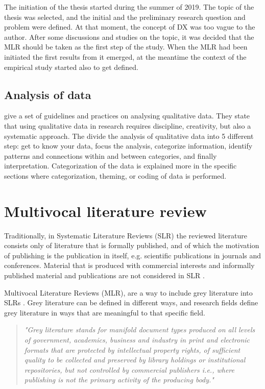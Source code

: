 \documentclass[english, 12pt, a4paper, sci, utf8, a-1b, online]{aaltothesis}
\begin{document}
The initiation of the thesis started during the summer of 2019. The topic of the thesis was selected, and the initial and the preliminary research question and problem were defined. At that moment, the concept of DX was too vague to the author. After some discussions and studies on the topic, it was decided that the MLR should be taken as the first step of the study. When the MLR had been initiated the first results from it emerged, at the meantime the context of the empirical study started also to get defined.

\subsection{Analysis of data}

\cite{analyzing-qualitative-data} give a set of guidelines and practices on analysing qualitative data. They state that using qualitative data in research requires discipline, creativity, but also a systematic approach. The divide the analysis of qualitative data into 5 different step: get to know your data, focus the analysis, categorize information, identify patterns and connections within and between categories, and finally interpretation. Categorization of the data is explained more in the specific sections where categorization, theming, or coding of data is performed.

\clearpage
\section{Multivocal literature review} \label{mlr}

Traditionally, in Systematic Literature Reviews (SLR) the reviewed literature consists only of literature that is formally published, and of which the motivation of publishing is the publication in itself, e.g. scientific publications in journals and conferences. Material that is produced with commercial interests and informally published material and publications are not considered in SLR \citep{guidelines-for-MLR}.

Multivocal Literature Reviews (MLR), are a way to include grey literature into SLRs \citep{the-need-for-MLR}. Grey literature can be defined in different ways, and research fields define grey literature in ways that are meaningful to that specific field.

\begin{quotation}
  \textit{"Grey literature stands for manifold document types produced on all levels of government, academics, business and industry in print and electronic formats that are protected by intellectual property rights, of sufficient quality to be collected and preserved by library holdings or institutional repositories, but not controlled by commercial publishers i.e., where publishing is not the primary activity of the producing body."} \citep{towards-a-prague-definition-of-grey-literature}
\end{quotation}
\end{document}
